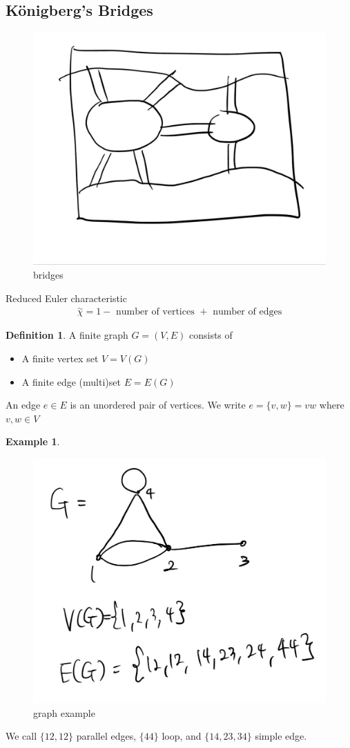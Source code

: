 \documentclass{article}
\theoremstyle{definition}
\newtheorem{defn}{Definition}[]
\newtheorem{ex}{Example}[]
\begin{document}
\subsection{K\"onigberg's Bridges}
\begin{figure}[!h]
    \centerline{\includegraphics[width=0.5\columnwidth]{bridges.jpg}}
    \caption{bridges}
    \label{bridges} 
\end{figure}
Reduced Euler characteristic
\begin{align*}
    \overset{\sim}{\chi} = 1- \text{ number of vertices } + \text{ number of edges}
\end{align*}
\begin{defn}
    A finite graph $G = (V, E)$ consists of 
    \begin{itemize}
        \item A finite vertex set $V= V(G)$
        \item A finite edge (multi)set $E= E(G)$
    \end{itemize}
    An edge $e \in E$ is an unordered pair of vertices. We write $e = \{v, w\}
    = vw$ where $v, w \in V$
\end{defn}
\begin{ex}
    \begin{figure}[!h]
        \centerline{\includegraphics[width=0.5\columnwidth]{graph_ex.jpg}}
        \caption{graph example}
        \label{graph example} 
    \end{figure}
    We call $\{12, 12\}$ parallel edges, $\{44\}$ loop, and $\{14, 23, 34\}$ simple edge.
\end{ex}
\end{document}
